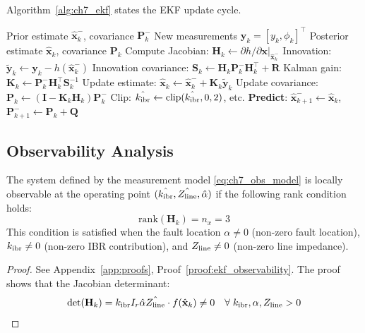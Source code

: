 Algorithm~\ref{alg:ch7_ekf} states the EKF update cycle.

\begin{algorithm}[htbp]
\caption{EKF State Estimation}
\label{alg:ch7_ekf}
\begin{algorithmic}[1]
\Require Prior estimate $\hat{\mathbf{x}}^-_{k}$, covariance $\mathbf{P}^-_k$
\Require New measurements $\mathbf{y}_k = [y_k, \phi_k]^\top$
\Ensure Posterior estimate $\hat{\mathbf{x}}_k$, covariance $\mathbf{P}_k$
\State Compute Jacobian: $\mathbf{H}_k \leftarrow \partial h/\partial \mathbf{x}|_{\hat{\mathbf{x}}^-_k}$
\State Innovation: $\tilde{\mathbf{y}}_k \leftarrow \mathbf{y}_k - h(\hat{\mathbf{x}}^-_k)$
\State Innovation covariance: $\mathbf{S}_k \leftarrow \mathbf{H}_k \mathbf{P}^-_k \mathbf{H}_k^\top + \mathbf{R}$
\State Kalman gain: $\mathbf{K}_k \leftarrow \mathbf{P}^-_k \mathbf{H}_k^\top \mathbf{S}_k^{-1}$
\State Update estimate: $\hat{\mathbf{x}}_k \leftarrow \hat{\mathbf{x}}^-_k + \mathbf{K}_k \tilde{\mathbf{y}}_k$
\State Update covariance: $\mathbf{P}_k \leftarrow (\mathbf{I} - \mathbf{K}_k \mathbf{H}_k)\mathbf{P}^-_k$
\State Clip: $\hat{k_\mathrm{ibr}} \leftarrow \mathrm{clip}(\hat{k_\mathrm{ibr}}, 0, 2)$, etc.
\State \textbf{Predict}: $\hat{\mathbf{x}}^-_{k+1} \leftarrow \hat{\mathbf{x}}_k$, \; $\mathbf{P}^-_{k+1} \leftarrow \mathbf{P}_k + \mathbf{Q}$
\end{algorithmic}
\end{algorithm}

\subsection{Observability Analysis}
\label{sec:ch9_observability}

\begin{proposition}
\label{prop:ch7_observability}
The system defined by the measurement model \eqref{eq:ch7_obs_model}
is locally observable at the operating point $(\hat{k_\mathrm{ibr}}, \hat{Z_\mathrm{line}}, \hat{\alpha})$
if the following rank condition holds:
\begin{equation}
  \mathrm{rank}(\mathbf{H}_k) = n_x = 3
  \label{eq:ch7_observability}
\end{equation}
This condition is satisfied when the fault location $\alpha \neq 0$
(non-zero fault location), $k_\mathrm{ibr} \neq 0$ (non-zero IBR contribution),
and $Z_\mathrm{line} \neq 0$ (non-zero line impedance).
\end{proposition}

\begin{proof}
See Appendix~\ref{app:proofs}, Proof~\ref{proof:ekf_observability}.
The proof shows that the Jacobian determinant:
\begin{equation}
  \det(\mathbf{H}_k) = k_\mathrm{ibr} I_r \hat{\alpha} \hat{Z_\mathrm{line}}
    \cdot f(\hat{\mathbf{x}}_k) \neq 0
    \quad\forall\; k_\mathrm{ibr}, \alpha, Z_\mathrm{line} > 0
  \label{eq:ch7_det}
\end{equation}
\end{proof}


